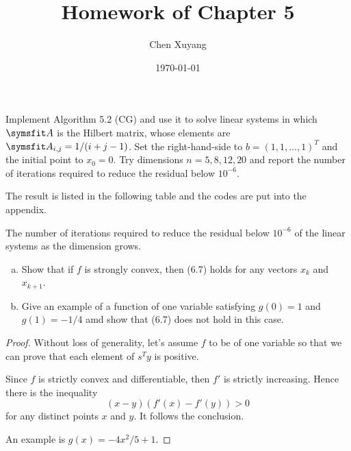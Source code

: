 \documentclass{assignment}[2019/10/15]
\title{Homework of Chapter 5}
\author{Chen Xuyang}
\date{\today}
\institute{School of Mathematical Science}
\begin{document}
    \maketitle
    \begin{problem}
        Implement Algorithm 5.2 (CG) and use it to solve linear systems in which $\matr{A}$ is the Hilbert matrix, whose elements are $\matr{A}_{i, j}=1/(i+j-1)$. Set the right-hand-side to $b=(1, 1, \dotsc, 1)^T$ and the initial point to $x_0=0$. Try dimensions $n = 5, 8, 12, 20$ and report the number of iterations required to reduce the residual below $10^{-6}$.
    \end{problem}
    \begin{solution}
        The result is listed in the following table and the codes are put into the appendix.
        \begin{table}[htb]
            \begin{center}
                \caption{The number of iterations required to reduce the residual below $10^{-6}$ of the linear systems as the dimension grows.}
            \end{center}
        \end{table}
    \end{solution}
    \begin{problem}
        \begin{enumerate}[(a)]
            \item Show that if $f$ is strongly convex, then (6.7) holds for any vectors $x_k$ and $x_{k+1}$.
            \item Give an example of a function of one variable satisfying $g(0)=1$ and $g(1)=-1/4$ amd show that (6.7) does not hold in this case.
        \end{enumerate}
    \end{problem}
    \begin{proof}
        Without loss of generality, let's assume $f$ to be of one variable so that we can prove that each element of $s^Ty$ is positive.

        Since $f$ is strictly convex and differentiable, then $f'$ is strictly increasing. Hence there is the inequality
        \begin{equation}
            (x-y)(f'(x)-f'(y))>0
        \end{equation}
        for any distinct points $x$ and $y$. It follows the conclusion.

        An example is $g(x)=-4x^2/5+1$.
    \end{proof}
\end{document}
